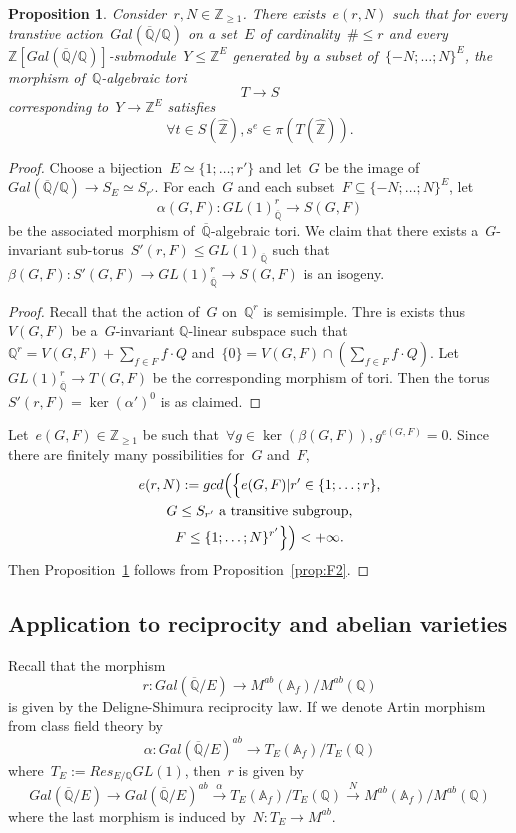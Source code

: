 \documentclass[12pt]{amsart}
\newtheorem{proposition}[theorem]{Proposition}
\newcommand{\Z}{{\mathbb Z}}
\newcommand{\Q}{{\mathbb Q}}
\newcommand{\A}{{\mathbb A}}
\newcommand{\ol}{\overline}
\newcommand{\wh}{\widehat}
\begin{document}
\begin{proposition}\label{prop:F3}
Consider~$r,N\in\Z_{\geq1}$.
There exists~$e(r,N)$ such that for every transtive action~$Gal(\ol{\Q}/\Q)$ on a set~$E$ of cardinality~$\#\leq r$ and every~$\Z[Gal(\ol{\Q}/\Q)]$-submodule~$Y\leq \Z^E$ generated by a subset of~$\{-N;\ldots;N\}^E$, the morphism of~$\Q$-algebraic tori
\[
T\to S
\] 
corresponding to~$Y\to \Z^E$ satisfies
\[
\forall t\in S(\wh{\Z}), s^e\in \pi(T(\wh{\Z})).
\]
\end{proposition}
\begin{proof}
Choose a bijection~$E\simeq \{1;\ldots; r'\}$ and let~$G$ be the image of~$Gal(\ol{\Q}/\Q)\to S_E\simeq S_{r'}$. For each~$G$ and each subset~$F\subseteq\{-N;\ldots;N\}^E$, let
\[
\alpha(G,F):GL(1)_{\ol{\Q}}^r\to S(G,F)
\]
be the associated morphism of~$\ol{\Q}$-algebraic tori. We claim that there exists a~$G$-invariant sub-torus~$S'(r,F)\leq GL(1)_{\ol{\Q}}$ such that~$\beta(G,F):S'(G,F)\to GL(1)_{\ol{\Q}}^r\to S(G,F)$ is an isogeny.
\begin{proof}Recall that the action of~$G$ on~$\Q^r$ is semisimple. Thre is exists thus~$V(G,F)$ be a~$G$-invariant $\Q$-linear subspace such that~$\Q^r=V(G,F)+\sum_{f\in F} f\cdot Q$ and~$\{0\}=V(G,F)\cap \left(\sum_{f\in F} f\cdot Q\right)$. Let~$GL(1)_{\ol{\Q}}^r\to T(G,F)$ be the corresponding morphism of tori. Then the torus~$S'(r,F)=\ker(\alpha')^0$ is as claimed.
\end{proof}
 Let~$e(G,F)\in\Z_{\geq1}$ be such that~$\forall g\in \ker(\beta(G,F)), g^{e(G,F)}=0$. Since there are finitely many possibilities for~$G$ and~$F$, 
\begin{multline}
e(r,N):={gcd}
\Bigl(
\Bigl\{e(G,F)|r'\in\{1;\ldots;r\},\\
G\leq S_{r'}\text{ a transitive subgroup},\\
F\leq \{1;\ldots;N\}^{r'}
\Bigr\}
\Bigr)
<+\infty.
\end{multline}
Then Proposition~\ref{prop:F3} follows from Proposition~\ref{prop:F2}.
\end{proof}
\subsection{Application to reciprocity and abelian varieties}
Recall that the morphism
\[
r:Gal(\ol{\Q}/E)\to M^{ab}(\A_f)/M^{ab}(\Q)
\]
is given by the Deligne-Shimura reciprocity law. 
If we denote Artin morphism from class field theory by
\[
\alpha:Gal(\ol{\Q}/E)^{ab}\to T_E(\A_f)/T_E(\Q)
\]
where~$T_E:=Res_{E/\Q}GL(1)$, then~$r$ is given by
\[
Gal(\ol{\Q}/E)\to Gal(\ol{\Q}/E)^{ab}\xrightarrow{\alpha} T_E(\A_f)/T_E(\Q)
\xrightarrow{N}
 M^{ab}(\A_f)/M^{ab}(\Q)
\]
where the last morphism is induced by~$N:T_E\to M^{ab}$.
\end{document}

